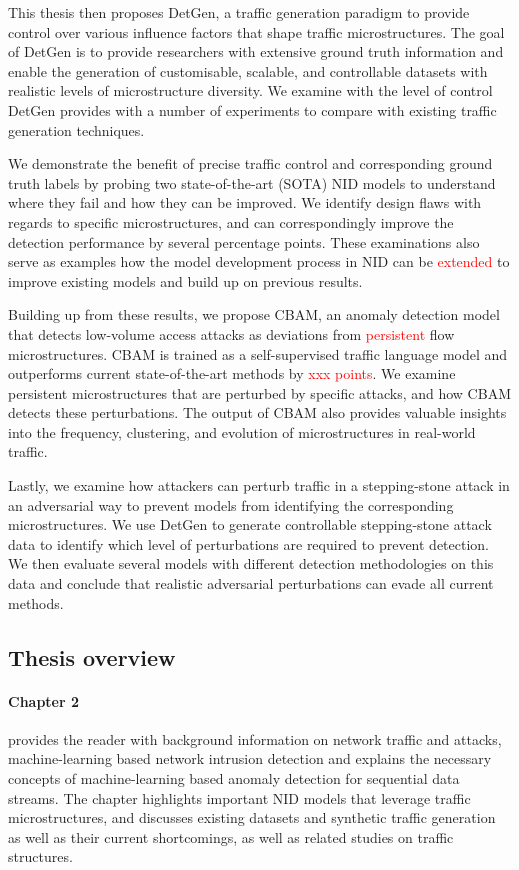 This thesis then proposes DetGen, a traffic generation paradigm to provide control over various influence factors that shape traffic microstructures. The goal of DetGen is to provide researchers with extensive ground truth information and enable the generation of customisable, scalable, and controllable datasets with realistic levels of microstructure diversity. We examine with the level of control DetGen provides with a number of experiments to compare with existing traffic generation techniques. 

We demonstrate the benefit of precise traffic control and corresponding ground truth labels by probing two state-of-the-art (SOTA) NID models to understand where they fail and how they can be improved. We identify design flaws with regards to specific microstructures, and can correspondingly improve the detection performance by several percentage points. These examinations also serve as examples how the model development process in NID can be \textcolor{red}{extended} to improve existing models and build up on previous results.

Building up from these results, we propose CBAM, an anomaly detection model that detects low-volume access attacks as deviations from \textcolor{red}{persistent} flow microstructures. CBAM is trained as a self-supervised traffic language model and outperforms current state-of-the-art methods by \textcolor{red}{xxx points}. We examine persistent microstructures that are perturbed by specific attacks, and how CBAM detects these perturbations. The output of CBAM also provides valuable insights into the frequency, clustering, and evolution of microstructures in real-world traffic.

Lastly, we examine how attackers can perturb traffic in a stepping-stone attack in an adversarial way to prevent models from identifying the corresponding microstructures. We use DetGen to generate controllable stepping-stone attack data to identify which level of perturbations are required to prevent detection. We then evaluate several models with different detection methodologies on this data and conclude that realistic adversarial perturbations can evade all current methods.

\subsection{Thesis overview}

\paragraph*{Chapter 2} provides the reader with background information on network traffic and attacks, machine-learning based network intrusion detection and explains the necessary concepts of machine-learning based anomaly detection for sequential data streams. The chapter highlights important NID models that leverage traffic microstructures, and discusses existing datasets and synthetic traffic generation as well as their current shortcomings, as well as related studies on traffic structures.

